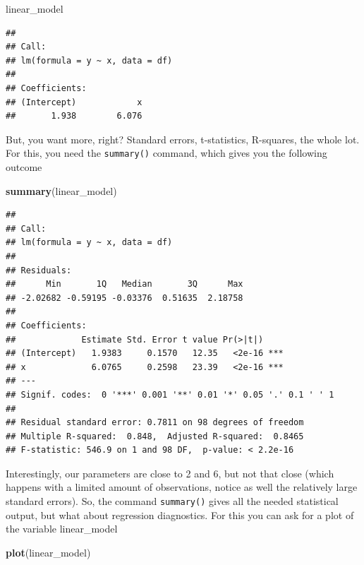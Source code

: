 \documentclass[]{article}
\newenvironment{Shaded}{\begin{snugshade}}{\end{snugshade}}
\newcommand{\KeywordTok}[1]{\textcolor[rgb]{0.13,0.29,0.53}{\textbf{#1}}}
\newcommand{\NormalTok}[1]{#1}
\theoremstyle{definition}
\theoremstyle{definition}
\theoremstyle{definition}
\theoremstyle{remark}
\begin{document}
\begin{Shaded}
\begin{Highlighting}[]
\NormalTok{linear_model}
\end{Highlighting}
\end{Shaded}

\begin{verbatim}
## 
## Call:
## lm(formula = y ~ x, data = df)
## 
## Coefficients:
## (Intercept)            x  
##       1.938        6.076
\end{verbatim}

But, you want more, right? Standard errors, t-statistics, R-squares, the
whole lot. For this, you need the \texttt{summary()} command, which
gives you the following outcome

\begin{Shaded}
\begin{Highlighting}[]
\KeywordTok{summary}\NormalTok{(linear_model)}
\end{Highlighting}
\end{Shaded}

\begin{verbatim}
## 
## Call:
## lm(formula = y ~ x, data = df)
## 
## Residuals:
##      Min       1Q   Median       3Q      Max 
## -2.02682 -0.59195 -0.03376  0.51635  2.18758 
## 
## Coefficients:
##             Estimate Std. Error t value Pr(>|t|)    
## (Intercept)   1.9383     0.1570   12.35   <2e-16 ***
## x             6.0765     0.2598   23.39   <2e-16 ***
## ---
## Signif. codes:  0 '***' 0.001 '**' 0.01 '*' 0.05 '.' 0.1 ' ' 1
## 
## Residual standard error: 0.7811 on 98 degrees of freedom
## Multiple R-squared:  0.848,  Adjusted R-squared:  0.8465 
## F-statistic: 546.9 on 1 and 98 DF,  p-value: < 2.2e-16
\end{verbatim}

Interestingly, our parameters are close to 2 and 6, but not that close
(which happens with a limited amount of observations, notice as well the
relatively large standard errors). So, the command \texttt{summary()}
gives all the needed statistical output, but what about regression
diagnostics. For this you can ask for a plot of the variable
linear\_model

\begin{Shaded}
\begin{Highlighting}[]
\KeywordTok{plot}\NormalTok{(linear_model)}
\end{Highlighting}
\end{Shaded}
\end{document}
